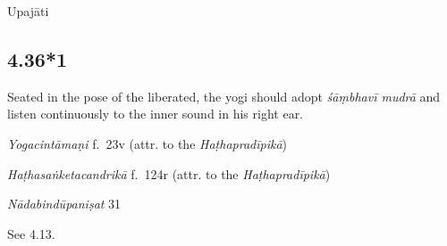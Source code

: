 \begin{ekdosis}
\begin{metre}[hp04_036]
Upajāti
\end{metre}

\subsection*{4.36*1}
\begin{translation}[hp04_036_1]
Seated in the pose of the liberated, the yogi should adopt \emph{śāṃbhavī mudrā} and listen continuously to the inner sound in his right ear.
\end{translation}


\begin{testimonia}[hp04_036_1]
\emph{Yogacintāmaṇi} f.~23v (attr. to the \emph{Haṭhapradīpikā})
\begin{versinnote}
\end{versinnote}

\emph{Haṭhasaṅketacandrikā} f.~124r (attr. to the \emph{Haṭhapradīpikā})
\begin{versinnote}
\tl{\var{dakṣiṇe karṇe ] B220,  dakṣirṇe 2244}\\!}
\end{versinnote}

\emph{Nādabindūpaniṣat} 31
\begin{versinnote}
\end{versinnote}
\end{testimonia}

\begin{philcomm}[hp04_036_1]
See 4.13.
\end{philcomm}


\end{ekdosis}
